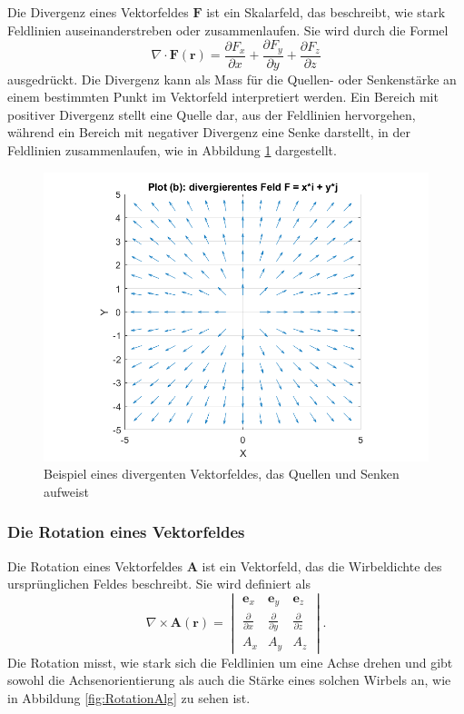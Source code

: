 Die Divergenz eines Vektorfeldes $\boldsymbol{F}$ ist ein Skalarfeld,
das beschreibt, wie stark Feldlinien auseinanderstreben oder
zusammenlaufen.
Sie wird durch die Formel
\begin{equation}
\nabla \cdot \boldsymbol{F}(\boldsymbol{r})
=
\frac{\partial F_x}{\partial x}
+
\frac{\partial F_y}{\partial y}
+
\frac{\partial F_z}{\partial z}
\end{equation}
ausgedrückt.
Die Divergenz kann als Mass für die Quellen- oder Senkenstärke an
einem bestimmten Punkt im Vektorfeld interpretiert werden.
Ein Bereich mit positiver Divergenz stellt eine Quelle dar, aus der
Feldlinien hervorgehen, während ein Bereich mit negativer Divergenz
eine Senke darstellt, in der Feldlinien zusammenlaufen, wie in
Abbildung \ref{fig:DivergenzAlg} dargestellt.

\begin{figure}
    \centering
    \includegraphics[scale=0.4]{papers/helmholtz/images/divergentes_Feld.png}
    \caption{Beispiel eines divergenten Vektorfeldes, das Quellen und Senken aufweist}
    \label{fig:DivergenzAlg}
\end{figure}

\subsubsection{Die Rotation eines Vektorfeldes}

Die Rotation eines Vektorfeldes $\boldsymbol{A}$ ist ein Vektorfeld,
das die Wirbeldichte des ursprünglichen Feldes beschreibt.
Sie wird definiert als
\begin{equation}
\nabla \times \boldsymbol{A}(\boldsymbol{r}) = \begin{vmatrix}
    \boldsymbol{e}_x & \boldsymbol{e}_y & \boldsymbol{e}_z \\
    \frac{\partial}{\partial x} & \frac{\partial}{\partial y} & \frac{\partial}{\partial z}\\
    A_x & A_y & A_z
\end{vmatrix}.
\end{equation}
Die Rotation misst, wie stark sich die Feldlinien um eine Achse
drehen und gibt sowohl die Achsenorientierung als auch die Stärke
eines solchen Wirbels an, wie in Abbildung \ref{fig:RotationAlg}
zu sehen ist.

